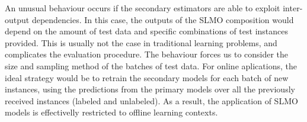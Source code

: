
\algTrainLocalModel
\algPredictLocalModel

An unusual behaviour occurs if the secondary estimators are able to exploit inter-output dependencies. In this case, the outputs of the SLMO composition would depend on the amount of test data and specific combinations of test instances provided. This is usually not the case in traditional learning problems, and complicates the evaluation procedure. The behaviour forces us to consider the size and sampling method of the batches of test data. For online aplications, the ideal strategy would be to retrain the secondary models for each batch of new instances, using the predictions from the primary models over all the previously received instances (labeled and unlabeled). As a result, the application of SLMO models is effectivelly restricted to offline learning contexts.



